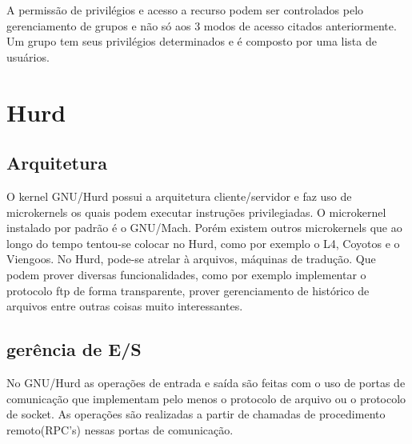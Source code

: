 \documentclass[conference]{IEEEtran}
\begin{document}
A permissão de privilégios e acesso a recurso podem ser controlados pelo gerenciamento de grupos e não só aos 3 modos de acesso citados anteriormente. Um grupo tem seus privilégios determinados e é composto por uma lista de usuários. \\
\section{Hurd}\label{sec:Hurd}
\subsection{Arquitetura}\label{sec:HurdArq}
O kernel GNU/Hurd possui a arquitetura cliente/servidor e faz uso de microkernels os quais podem executar instruções privilegiadas. O microkernel instalado por padrão é o GNU/Mach. Porém existem outros microkernels que ao longo do tempo tentou-se colocar no Hurd, como por exemplo o L4, Coyotos e o Viengoos. No Hurd, pode-se atrelar à arquivos, máquinas de tradução. Que podem prover diversas funcionalidades, como por exemplo implementar o protocolo ftp de forma transparente, prover gerenciamento de histórico de arquivos entre outras coisas muito interessantes.\cite{HurdPaper}
\subsection{gerência de E/S}\label{sec:HurdES}
No GNU/Hurd as operações de entrada e saída são feitas com o uso de portas de comunicação que implementam pelo menos o protocolo de arquivo ou o protocolo de socket. As operações são realizadas a partir de chamadas de procedimento remoto(RPC's) nessas portas de comunicação\cite{HurdIO}.
\end{document}
